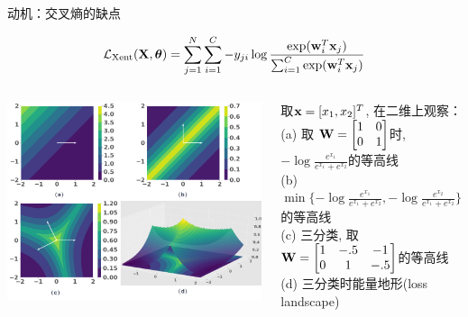 \documentclass[usenames,dvipsnames,notes]{beamer}
\newcommand{\liuhao}{\fontsize{7.875pt}{\baselineskip}\selectfont}  %
\begin{document}
\begin{frame}{动机：交叉熵的缺点}

	\begin{equation}
		\mathcal{L}_{\textrm{Xent}} ({\mathbf{X}}, {\boldsymbol{\theta}}) = \sum_{j=1}^{N} \sum_{i=1}^{C}
		- y_{ji} \log \frac{\exp({\mathbf{w}}_i^T {\mathbf{x}}_j)}{ \sum_{i=1}^C \exp({\mathbf{w}}_i^T {\mathbf{x}}_j) }
	\end{equation}
\begin{columns}
	\includegraphics[width=\textwidth]{fig/xent.png}
	
{\liuhao 
取${\mathbf{x}}=[x_1,x_2]^T$, 在二维上观察：\\ 
(a) 取
$
{\mathbf{W}}= \begin{bmatrix}
1 & 0 \\ 
0& 1
\end{bmatrix}
$时, $-\log\frac{e^{x_1}}{e^{x_1}+e^{x_2}}$的等高线 \\
(b) $\min\{{-\log}\frac{e^{x_1}}{e^{x_1}+e^{x_2}}, -\log\frac{e^{x_2}}{e^{x_1}+e^{x_2}}\}$的等高线 \\
(c)  三分类, 取
$
{\mathbf{W}}= \begin{bmatrix}
1 & -.5 & -1 \\ 
0&1& -.5 
\end{bmatrix}$的等高线 \\
(d) 三分类时能量地形(loss landscape) 
}
\end{columns}

\end{frame}
\end{document}
